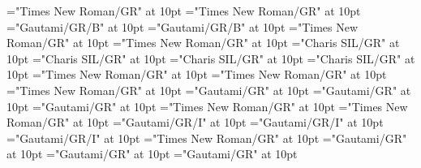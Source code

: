 \documentclass[c5paper,twoside]{article}
\begin{document}
\font\pictureLabelenpictureCaptionpictureRightentryletDatadicBody="Times New Roman/GR" at 10pt
\font\spanenpictureLabelenpictureCaptionpictureRightentryletDatadicBody="Times New Roman/GR" at 10pt
\font\headwordggoTeluINentryletDatadicBody="Gautami/GR/B" at 10pt
\font\headwordafterentryletDatadicBody="Gautami/GR/B" at 10pt
\font\pronunciationsentryletDatadicBody="Times New Roman/GR" at 10pt
\font\pronunciationsafterentryletDatadicBody="Times New Roman/GR" at 10pt
\font\pronunciationggofonipaxemicpronunciationsentryletDatadicBody="Charis SIL/GR" at 10pt
\font\pronunciationbeforepronunciationsentryletDatadicBody="Charis SIL/GR" at 10pt
\font\pronunciationafterpronunciationsentryletDatadicBody="Charis SIL/GR" at 10pt
\font\spanggofonipaxemicpronunciationggofonipaxemicpronunciationsentryletDatadicBody="Charis SIL/GR" at 10pt
\font\sensesentryletDatadicBody="Times New Roman/GR" at 10pt
\font\sensesafterentryletDatadicBody="Times New Roman/GR" at 10pt
\font\sensesensesentryletDatadicBody="Times New Roman/GR" at 10pt
\font\LexSensepublishStemGlossPubLdtesensesensesentryletDatadicBody="Gautami/GR" at 10pt
\font\LexSensepublishStemGlossPubLdaftersensesensesentryletDatadicBody="Gautami/GR" at 10pt
\font\spanteLexSensepublishStemGlossPubLdtesensesensesentryletDatadicBody="Gautami/GR" at 10pt
\font\examplessensesensesentryletDatadicBody="Times New Roman/GR" at 10pt
\font\examplesaftersensesensesentryletDatadicBody="Times New Roman/GR" at 10pt
\font\exampleggoTeluINexamplessensesensesentryletDatadicBody="Gautami/GR/I" at 10pt
\font\exampleafterexamplessensesensesentryletDatadicBody="Gautami/GR/I" at 10pt
\font\spanggoTeluINexampleggoTeluINexamplessensesensesentryletDatadicBody="Gautami/GR/I" at 10pt
\font\translationsexamplessensesensesentryletDatadicBody="Times New Roman/GR" at 10pt
\font\translationLdtetranslationsexamplessensesensesentryletDatadicBody="Gautami/GR" at 10pt
\font\translationLdaftertranslationsexamplessensesensesentryletDatadicBody="Gautami/GR" at 10pt
\font\spantetranslationLdtetranslationsexamplessensesensesentryletDatadicBody="Gautami/GR" at 10pt
\end{document}
